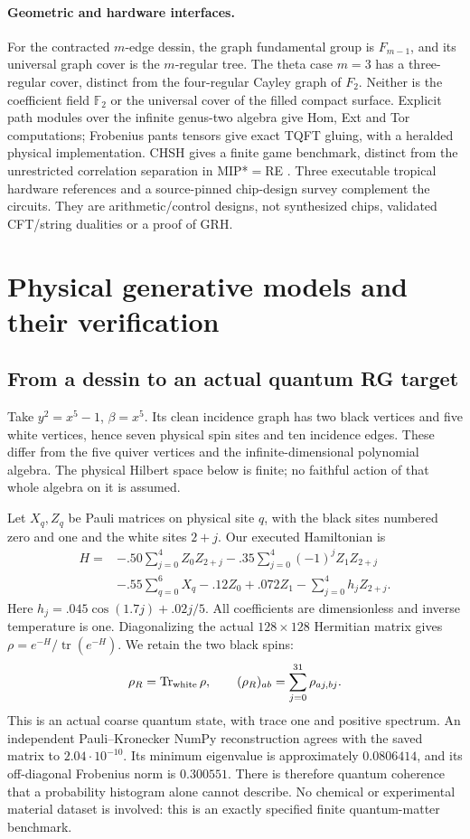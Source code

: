 \documentclass[11pt,oneside,openany]{book}
\theoremstyle{definition}\newtheorem{definition}[theorem]{Definition}
\theoremstyle{remark}\newtheorem{remark}[theorem]{Remark}
\begin{document}
\paragraph{Geometric and hardware interfaces.}
For the contracted $m$-edge dessin, the graph fundamental group is
$F_{m-1}$, and its universal graph cover is the $m$-regular tree.
The theta case $m=3$ has a three-regular cover, distinct from the four-regular
Cayley graph of $F_2$. Neither is the coefficient field $\mathbb F_2$ or the
universal cover of the filled compact surface. Explicit path modules over the
infinite genus-two algebra give Hom, Ext and Tor computations; Frobenius
pants tensors give exact TQFT gluing, with a heralded physical implementation.
CHSH gives a finite game benchmark, distinct from the unrestricted
correlation separation in MIP*$=$RE \cite{LFMIP}. Three executable tropical
hardware references and a source-pinned chip-design survey complement the
circuits. They are arithmetic/control designs, not synthesized chips,
validated CFT/string dualities or a proof of GRH.

\section{Physical generative models and their verification}\label{lf:details}
\subsection{From a dessin to an actual quantum RG target}
Take $y^2=x^5-1$, $\beta=x^5$. Its clean incidence graph has two black
vertices and five white vertices, hence seven physical spin sites and ten
incidence edges. These differ from the five quiver vertices and the
infinite-dimensional polynomial algebra. The physical Hilbert space below
is finite; no faithful action of that whole algebra on it is assumed.

Let $X_q,Z_q$ be Pauli matrices on physical site $q$, with the black sites
numbered zero and one and the white sites $2+j$. Our executed Hamiltonian is
\[
\begin{aligned}
 H={}&-.50\sum_{j=0}^4 Z_0Z_{2+j}
   -.35\sum_{j=0}^4(-1)^jZ_1Z_{2+j}\\
 &-.55\sum_{q=0}^6 X_q-.12Z_0+.072Z_1
   -\sum_{j=0}^4 h_jZ_{2+j}.
\end{aligned}
\]
Here $h_j=.045\cos(1.7j)+.02j/5$.
All coefficients are dimensionless and inverse temperature is one.
Diagonalizing the actual $128\times128$ Hermitian matrix gives
$\rho=e^{-H}/\operatorname{tr}(e^{-H})$. We retain the two black spins:
\[
 \rho_R=\operatorname{Tr}_{\rm white}\rho,\qquad
 (\rho_R)_{ab}=\sum_{j=0}^{31}\rho_{aj,bj}.
\]
This is an actual coarse quantum state, with trace one and positive spectrum.
An independent Pauli--Kronecker NumPy reconstruction agrees with the saved
matrix to $2.04\cdot10^{-10}$. Its minimum eigenvalue is approximately
$0.0806414$, and its off-diagonal Frobenius norm is $0.300551$.
There is therefore quantum coherence that a probability histogram alone
cannot describe. No chemical or experimental material dataset is involved:
this is an exactly specified finite quantum-matter benchmark.
\end{document}

